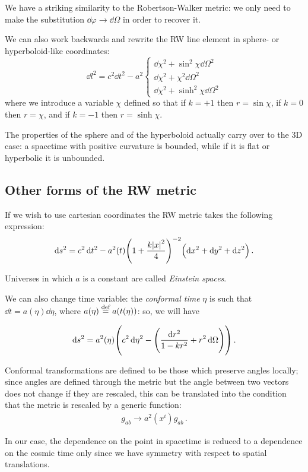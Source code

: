 \documentclass[main.tex]{subfiles}
\begin{document}
We have a striking similarity to the Robertson-Walker metric: we only need to make the substitution \(\dd{\varphi } \rightarrow \dd{\Omega }\) in order to recover it.

We can also work backwards and rewrite the RW line element in sphere- or hyperboloid-like coordinates:
\begin{equation}
  \dd{l^2} = c^2 \dd{t^2} - a^2 \begin{cases}
      \dd{\chi^2} + \sin^2 \chi \dd{\Omega^2} \\
      \dd{\chi^2} + \chi^2\dd{\Omega^2} \\
      \dd{\chi^2} + \sinh^2 \chi \dd{\Omega^2}
\end{cases}
\end{equation}
%
where we introduce a variable \(\chi \) defined so that if \(k = +1\) then \(r = \sin \chi\), if \(k=0\)  then \(r=\chi\), and if \(k = -1\) then \(r = \sinh \chi\).

The properties of the sphere and of the hyperboloid actually carry over to the 3D case: a spacetime with positive curvature is bounded, while if it is flat or hyperbolic it is unbounded.

\subsection{Other forms of the RW metric}

If we wish to use cartesian coordinates the RW metric takes the following expression:
%
\begin{equation}
  \dd{s^2} = c^2 \dd{t^2} - a^2 (t) \qty(1 + \frac{k \abs{x}^2}{4} )^{-2} \qty(\dd{x^2} + \dd{y^2} + \dd{z^2}) \,.
\end{equation}

Universes in which \(a\) is a constant are called \emph{Einstein spaces}.

We can also change time variable: the \emph{conformal time} \(\eta \) is such that \(\dd{t} = a(\eta) \dd{\eta} \), where \(a(\eta) \stackrel{\text{def}}{=} a(t(\eta))\): so, we will have

\begin{equation}
  \dd{s^2} = a^2 (\eta) \qty(c^2 \dd{\eta^2} - \qty(\frac{\dd{r^2}}{1 - kr^2} + r^2 \dd{\Omega})) \,.
\end{equation}

\begin{bluebox}
Conformal transformations are defined to be those which preserve angles locally; since angles are defined through the metric but the angle between two vectors does not change if they are rescaled, this can be translated into the condition that the metric is rescaled by a generic function:
%
\begin{align}
g_{ab} \rightarrow a^2(x^{i}) g_{ab}
\,.
\end{align}

In our case, the dependence on the point in spacetime is reduced to a dependence on the cosmic time only since we have symmetry with respect to spatial translations.
\end{bluebox}
\end{document}
